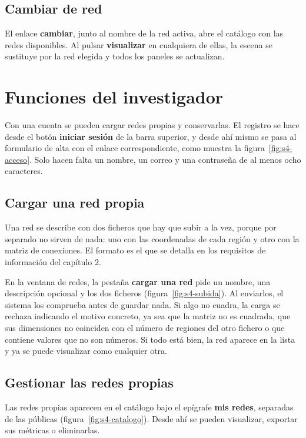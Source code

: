 \subsection{Cambiar de red}

El enlace \textbf{cambiar}, junto al nombre de la red activa, abre el catálogo con las redes
disponibles. Al pulsar \textbf{visualizar} en cualquiera de ellas, la escena se sustituye por la red
elegida y todos los paneles se actualizan.

\section{Funciones del investigador}

Con una cuenta se pueden cargar redes propias y conservarlas. El registro se hace desde el botón
\textbf{iniciar sesión} de la barra superior, y desde ahí mismo se pasa al formulario de alta con el
enlace correspondiente, como muestra la figura~\ref{fig:s4-acceso}. Solo hacen falta un nombre, un
correo y una contraseña de al menos ocho caracteres.

\subsection{Cargar una red propia}

Una red se describe con dos ficheros que hay que subir a la vez, porque por separado no sirven de
nada: uno con las coordenadas de cada región y otro con la matriz de conexiones. El formato es el
que se detalla en los requisitos de información del capítulo 2.

En la ventana de redes, la pestaña \textbf{cargar una red} pide un nombre, una descripción opcional y
los dos ficheros (figura~\ref{fig:s4-subida}). Al enviarlos, el sistema los comprueba antes de
guardar nada. Si algo no cuadra, la carga se rechaza indicando el motivo concreto, ya sea que la
matriz no es cuadrada, que sus dimensiones no coinciden con el número de regiones del otro fichero o
que contiene valores que no son números. Si todo está bien, la red aparece en la lista y ya se puede
visualizar como cualquier otra.

\subsection{Gestionar las redes propias}

Las redes propias aparecen en el catálogo bajo el epígrafe \textbf{mis redes}, separadas de las
públicas (figura~\ref{fig:s4-catalogo}). Desde ahí se pueden visualizar, exportar sus métricas o
eliminarlas.

